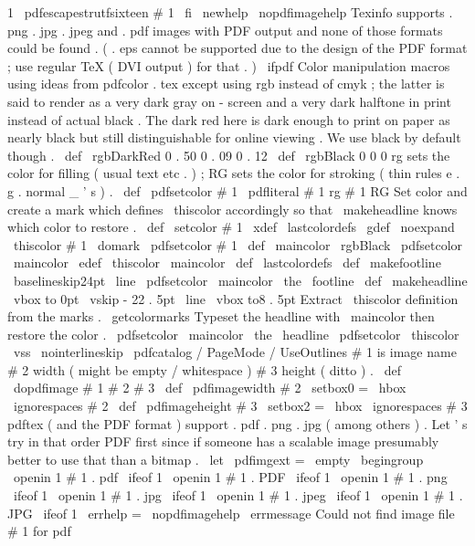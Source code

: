 {{1
{
\
pdfescapestrutfsixteen
{
#
1
}
}
%
\
fi
}
\
newhelp
\
nopdfimagehelp
{
Texinfo
supports
.
png
.
jpg
.
jpeg
and
.
pdf
images
with
PDF
output
and
none
of
those
formats
could
be
found
.
(
.
eps
cannot
be
supported
due
to
the
design
of
the
PDF
format
;
use
regular
TeX
(
DVI
output
)
for
that
.
)
}
\
ifpdf
%
%
Color
manipulation
macros
using
ideas
from
pdfcolor
.
tex
%
except
using
rgb
instead
of
cmyk
;
the
latter
is
said
to
render
as
a
%
very
dark
gray
on
-
screen
and
a
very
dark
halftone
in
print
instead
%
of
actual
black
.
The
dark
red
here
is
dark
enough
to
print
on
paper
as
%
nearly
black
but
still
distinguishable
for
online
viewing
.
We
use
%
black
by
default
though
.
\
def
\
rgbDarkRed
{
0
.
50
0
.
09
0
.
12
}
\
def
\
rgbBlack
{
0
0
0
}
%
%
rg
sets
the
color
for
filling
(
usual
text
etc
.
)
;
%
RG
sets
the
color
for
stroking
(
thin
rules
e
.
g
.
normal
_
'
s
)
.
\
def
\
pdfsetcolor
#
1
{
\
pdfliteral
{
#
1
rg
#
1
RG
}
}
%
%
Set
color
and
create
a
mark
which
defines
\
thiscolor
accordingly
%
so
that
\
makeheadline
knows
which
color
to
restore
.
\
def
\
setcolor
#
1
{
%
\
xdef
\
lastcolordefs
{
\
gdef
\
noexpand
\
thiscolor
{
#
1
}
}
%
\
domark
\
pdfsetcolor
{
#
1
}
%
}
%
\
def
\
maincolor
{
\
rgbBlack
}
\
pdfsetcolor
{
\
maincolor
}
\
edef
\
thiscolor
{
\
maincolor
}
\
def
\
lastcolordefs
{
}
%
\
def
\
makefootline
{
%
\
baselineskip24pt
\
line
{
\
pdfsetcolor
{
\
maincolor
}
\
the
\
footline
}
%
}
%
\
def
\
makeheadline
{
%
\
vbox
to
0pt
{
%
\
vskip
-
22
.
5pt
\
line
{
%
\
vbox
to8
.
5pt
{
}
%
%
Extract
\
thiscolor
definition
from
the
marks
.
\
getcolormarks
%
Typeset
the
headline
with
\
maincolor
then
restore
the
color
.
\
pdfsetcolor
{
\
maincolor
}
\
the
\
headline
\
pdfsetcolor
{
\
thiscolor
}
%
}
%
\
vss
}
%
\
nointerlineskip
}
%
%
\
pdfcatalog
{
/
PageMode
/
UseOutlines
}
%
%
#
1
is
image
name
#
2
width
(
might
be
empty
/
whitespace
)
#
3
height
(
ditto
)
.
\
def
\
dopdfimage
#
1
#
2
#
3
{
%
\
def
\
pdfimagewidth
{
#
2
}
\
setbox0
=
\
hbox
{
\
ignorespaces
#
2
}
%
\
def
\
pdfimageheight
{
#
3
}
\
setbox2
=
\
hbox
{
\
ignorespaces
#
3
}
%
%
%
pdftex
(
and
the
PDF
format
)
support
.
pdf
.
png
.
jpg
(
among
%
others
)
.
Let
'
s
try
in
that
order
PDF
first
since
if
%
someone
has
a
scalable
image
presumably
better
to
use
that
than
a
%
bitmap
.
\
let
\
pdfimgext
=
\
empty
\
begingroup
\
openin
1
#
1
.
pdf
\
ifeof
1
\
openin
1
#
1
.
PDF
\
ifeof
1
\
openin
1
#
1
.
png
\
ifeof
1
\
openin
1
#
1
.
jpg
\
ifeof
1
\
openin
1
#
1
.
jpeg
\
ifeof
1
\
openin
1
#
1
.
JPG
\
ifeof
1
\
errhelp
=
\
nopdfimagehelp
\
errmessage
{
Could
not
find
image
file
#
1
for
pdf
}}}
